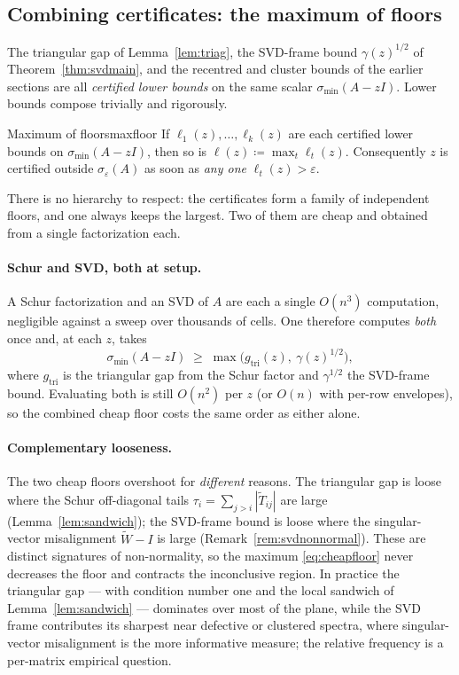 \documentclass[11pt, a4paper]{article}
\numberwithin{equation}{section}
\newcommand{\abs}[1]{\left|#1\right|}
\newcommand{\tT}{\widetilde{T}}
\newcommand{\tW}{\widetilde{W}}
\begin{document}
\subsection{Combining certificates: the maximum of floors}
\label{subsec:svdcombine}

The triangular gap of Lemma~\ref{lem:triag}, the SVD-frame bound
$\gamma(z)^{1/2}$ of Theorem~\ref{thm:svdmain}, and the recentred and cluster
bounds of the earlier sections are all \emph{certified lower bounds} on the same
scalar $\sigma_{\min}(A - zI)$.  Lower bounds compose trivially and rigorously.

\begin{lemma}{Maximum of floors}{maxfloor}
  If $\ell_1(z), \ldots, \ell_k(z)$ are each certified lower bounds on
  $\sigma_{\min}(A - zI)$, then so is $\ell(z) \coloneqq \max_t \ell_t(z)$.
  Consequently $z$ is certified outside $\sigma_\varepsilon(A)$ as soon as
  \emph{any one} $\ell_t(z) > \varepsilon$.
\end{lemma}

There is no hierarchy to respect: the certificates form a family of independent
floors, and one always keeps the largest.  Two of them are cheap and obtained
from a single factorization each.

\paragraph{Schur and SVD, both at setup.}
A Schur factorization and an SVD of $A$ are each a single $O(n^3)$ computation,
negligible against a sweep over thousands of cells.  One therefore computes
\emph{both} once and, at each $z$, takes
\begin{equation}\label{eq:cheapfloor}
  \sigma_{\min}(A - zI) \;\ge\;
    \max\bigl(g_{\mathrm{tri}}(z),\ \gamma(z)^{1/2}\bigr),
\end{equation}
where $g_{\mathrm{tri}}$ is the triangular gap from the Schur factor and
$\gamma^{1/2}$ the SVD-frame bound.  Evaluating both is still $O(n^2)$ per $z$
(or $O(n)$ with per-row envelopes), so the combined cheap floor costs the same
order as either alone.

\paragraph{Complementary looseness.}
The two cheap floors overshoot for \emph{different} reasons.  The triangular gap
is loose where the Schur off-diagonal tails $\tau_i = \sum_{j>i}
\abs{\tT_{ij}}$ are large (Lemma~\ref{lem:sandwich}); the SVD-frame bound is loose
where the singular-vector misalignment $\tW - I$ is large
(Remark~\ref{rem:svdnonnormal}).  These are distinct signatures of
non-normality, so the maximum \eqref{eq:cheapfloor} never decreases the floor and
contracts the inconclusive region.  In practice the triangular gap --- with
condition number one and the local sandwich of Lemma~\ref{lem:sandwich} ---
dominates over most of the plane, while the SVD frame contributes its sharpest
near defective or clustered spectra, where singular-vector misalignment is the
more informative measure; the relative frequency is a per-matrix empirical
question.
\end{document}
